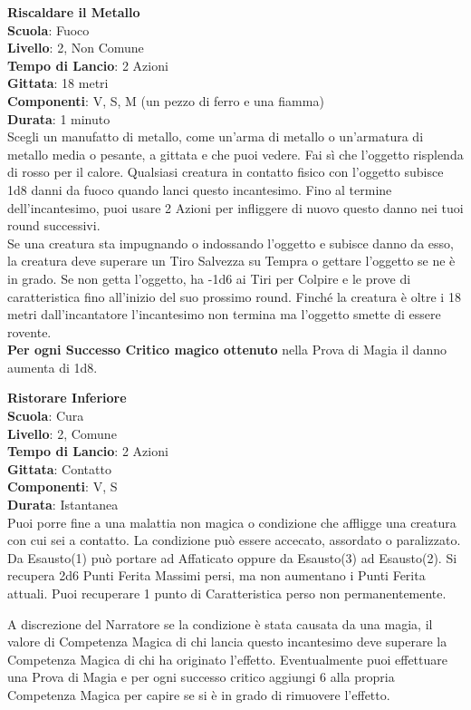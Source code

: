 \begin{multicols}{2}
\medskip\textbf{Riscaldare il Metallo}\\
\textbf{Scuola}: Fuoco\\
\textbf{Livello}: 2, Non Comune\\
\textbf{Tempo di Lancio}: 2 Azioni\\
\textbf{Gittata}: 18 metri\\
\textbf{Componenti}: V, S, M (un pezzo di ferro e una fiamma)\\
\textbf{Durata}: 1 minuto\\
Scegli un manufatto di metallo, come un'arma di metallo o un'armatura di metallo media o pesante, a gittata e che puoi vedere. Fai sì che l'oggetto risplenda di rosso per il calore. Qualsiasi creatura in contatto fisico con l'oggetto subisce 1d8 danni da fuoco quando lanci questo incantesimo. Fino al termine dell'incantesimo, puoi usare 2 Azioni per infliggere di nuovo questo danno nei tuoi round successivi.\\
Se una creatura sta impugnando o indossando l'oggetto e subisce danno da esso, la creatura deve superare un Tiro Salvezza su Tempra o gettare l'oggetto se ne è in grado. Se non getta l'oggetto, ha -1d6 ai Tiri per Colpire e le prove di caratteristica fino all'inizio del suo prossimo round. Finché la creatura è oltre i 18 metri dall'incantatore l'incantesimo non termina ma l'oggetto smette di essere rovente.\\
\textbf{Per ogni Successo Critico magico ottenuto} nella Prova di Magia il danno aumenta di 1d8.

\medskip\textbf{Ristorare Inferiore}\\
\textbf{Scuola}: Cura\\
\textbf{Livello}: 2, Comune\\
\textbf{Tempo di Lancio}: 2 Azioni\\
\textbf{Gittata}: Contatto\\
\textbf{Componenti}: V, S\\
\textbf{Durata}: Istantanea\\
Puoi porre fine a una malattia non magica o condizione che affligge una creatura con cui sei a contatto. La condizione può essere accecato, assordato o paralizzato. Da Esausto(1) può portare ad Affaticato oppure da Esausto(3) ad Esausto(2). Si recupera 2d6 Punti Ferita Massimi persi, ma non aumentano i Punti Ferita attuali. Puoi recuperare 1 punto di Caratteristica perso non permanentemente.

A discrezione del Narratore se la condizione è stata causata da una magia, il valore di Competenza Magica di chi lancia questo incantesimo deve superare la Competenza Magica di chi ha originato l'effetto.
Eventualmente puoi effettuare una Prova di Magia e per ogni successo critico aggiungi 6 alla propria Competenza Magica per capire se si è in grado di rimuovere l'effetto.


\end{multicols}
